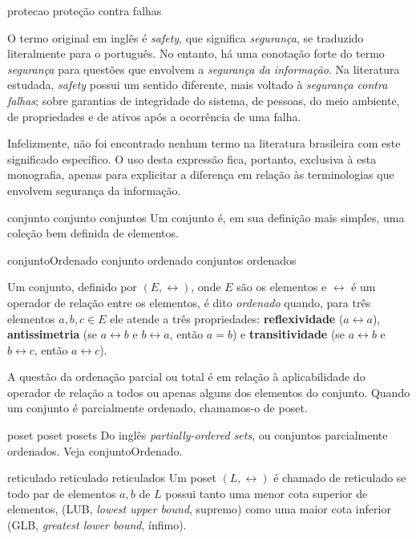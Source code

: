 \novadefinicao
    {protecao}
    {proteção contra falhas}
    {
        O termo original em inglês é \emph{safety}, que significa 
        \emph{segurança}, se traduzido literalmente para o português. No 
        entanto, há uma conotação forte do termo \emph{segurança} para questões 
        que envolvem a \emph{segurança da informação}. Na literatura estudada, 
        \emph{safety} possui um sentido diferente, mais voltado à 
        \emph{segurança contra falhas}; sobre garantias de integridade do 
        sistema, de pessoas, do meio ambiente, de propriedades e de ativos após 
        a ocorrência de uma falha.
        
        Infelizmente, não foi encontrado nenhum termo na literatura brasileira 
        com este significado específico. O uso desta expressão fica, portanto, 
        exclusiva à esta monografia, apenas para explicitar a diferença em 
        relação às terminologias que envolvem segurança da informação.
    }

\novadefinicaopl
    {conjunto}
    {conjunto}
    {conjuntos}
    {
        Um conjunto é, em sua definição mais simples, uma coleção bem definida 
        de elementos.
    }

\novadefinicaopl
    {conjuntoOrdenado}
    {conjunto ordenado}
    {conjuntos ordenados}
    {
        Um \gls{conjunto}, definido por $(E, \rel)$, onde $E$ são os elementos 
        e $\rel$ é um operador de relação entre os elementos, é dito 
        \emph{ordenado} quando, para três elementos $a, b, c \in E$ ele atende 
        a três propriedades: \textbf{reflexividade} ($a \rel a$), 
        \textbf{antissimetria} (se $a \rel b$ e $b \rel a$, então $a = b$) e 
        \textbf{transitividade} (se $a \rel b$ e $b \rel c$, então $a \rel c$).
        
        A questão da ordenação parcial ou total é em relação à aplicabilidade
        do operador de relação a todos ou apenas alguns dos elementos do 
        conjunto. Quando um conjunto é parcialmente ordenado, chamamos-o de 
        \gls{poset}.
    }

\novadefinicaopl
    {poset}
    {poset}
    {posets}
    {
        Do inglês \emph{partially-ordered sets}, ou conjuntos parcialmente 
        ordenados. Veja \gls{conjuntoOrdenado}.
    }

\novadefinicaopl
    {reticulado}
    {reticulado}
    {reticulados}
    {
        Um \gls{poset} $(L, \rel)$ é chamado de reticulado se todo par
        de elementos ${a, b}$ de $L$ possui tanto uma menor cota superior de 
        elementos, (LUB, \emph{lowest upper bound}, supremo) como uma maior 
        cota inferior (GLB, \emph{greatest lower bound}, ínfimo).
    }